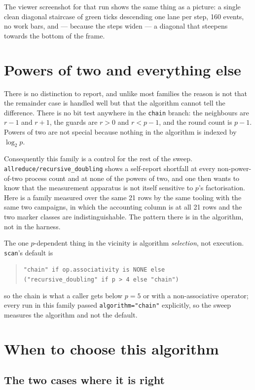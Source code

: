 \documentclass[11pt]{article}
\begin{document}
The viewer screenshot for that run shows the same thing as a picture: a single clean diagonal
staircase of green ticks descending one lane per step, 160 events, no work bars, and --- because
the steps widen --- a diagonal that steepens towards the bottom of the frame.

\section{Powers of two and everything else}

There is no distinction to report, and unlike most families the reason is not that the remainder
case is handled well but that the algorithm cannot tell the difference. There is no bit test
anywhere in the \texttt{chain} branch: the neighbours are $r-1$ and $r+1$, the guards are $r>0$
and $r<p-1$, and the round count is $p-1$. Powers of two are not special because nothing in the
algorithm is indexed by $\log_2 p$.

Consequently this family is a control for the rest of the sweep.
\texttt{allreduce/recursive\_doubling} shows a self-report shortfall at every non-power-of-two
process count and at none of the powers of two, and one then wants to know that the measurement
apparatus is not itself sensitive to $p$'s factorisation. Here is a family measured over the same
21 rows by the same tooling with the same two campaigns, in which the accounting column is
\modelok{} at all 21 rows and the two marker classes are indistinguishable. The pattern there is
in the algorithm, not in the harness.

The one $p$-dependent thing in the vicinity is algorithm \emph{selection}, not execution.
\texttt{scan}'s default is

\begin{quote}
\texttt{"chain" if op.associativity is NONE else\\("recursive\_doubling" if p > 4 else "chain")}
\end{quote}

\noindent
so the chain is what a caller gets below $p=5$ or with a non-associative operator; every run in
this family passed \texttt{algorithm="chain"} explicitly, so the sweep measures the algorithm and
not the default.

\section{When to choose this algorithm}

\subsection{The two cases where it is right}
\end{document}
